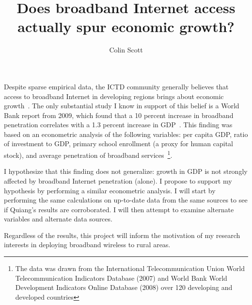 \documentclass[10pt]{article}
\title{Does broadband Internet access actually spur economic growth?}
\author{Colin Scott}
\begin{document}
\maketitle

Despite sparse empirical data, the ICTD community generally believes that access
to broadband Internet in developing regions brings about economic growth~\cite{brewer2005case}.
The only substantial study I know in support of this belief is a World Bank report
from 2009, which found that a 10 percent increase in broadband penetration
correlates with a 1.3 percent increase in GDP~\cite{qiang2009economic}. This
finding was based on an econometric analysis of the following
variables: per capita GDP, ratio of
investment to GDP, primary school enrollment (a proxy for human capital stock),
and average penetration of broadband services~\footnote{The data was drawn
from the International Telecommunication Union World
Telecommunication Indicators Database (2007) and World Bank World Development Indicators Online
Database (2008) over 120 developing
and developed countries}.

I hypothesize that this finding does not generalize: growth in GDP is not
strongly affected by broadband Internet penetration (alone). I propose to
support my hypothesis by performing a similar econometric analysis. I will
start by performing the same calculations on up-to-date data from the same
sources to see if
Quiang's results are corroborated. I will then attempt to examine alternate
variables and alternate data sources.

Regardless of the results, this project
will inform the motivation of my research interests in deploying broadband
wireless to rural areas.







\end{document}
